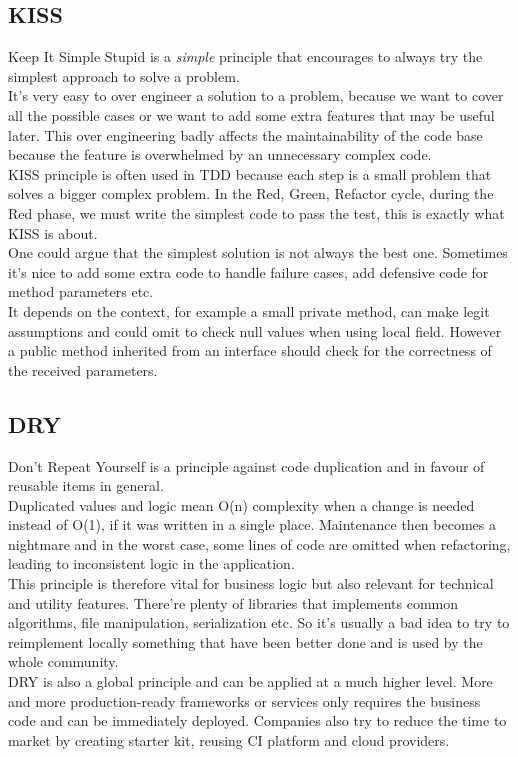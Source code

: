 \subsection{KISS}\label{subsec:kiss}
Keep It Simple Stupid is a \textit{simple} principle that encourages to
always try the simplest approach to solve a problem. \\
\newline
It's very easy to over engineer a solution to a problem, because we want
to cover all the possible cases or we want to add some extra
features that may be useful later.
This over engineering badly affects the maintainability of the code base
because the feature is overwhelmed by an unnecessary complex code. \\
\newline
KISS principle is often used in TDD because each step is a small
problem that solves a bigger complex problem.
In the Red, Green, Refactor cycle, during the Red phase, we must write
the simplest code to pass the test, this is exactly what KISS is about.
\\
\newline
One could argue that the simplest solution is not always the best one.
Sometimes it's nice to add some extra code to handle failure cases, add
defensive code for method parameters etc. \\
It depends on the context, for example a small private method, can make
legit assumptions and could omit to check null values when using
local field.
However a public method inherited from an interface should check for the
correctness of the received parameters.

\subsection{DRY}\label{subsec:dry}
Don't Repeat Yourself is a principle against code duplication and in
favour of reusable items in general. \\
\newline
Duplicated values and logic mean O(n) complexity when a change is needed
instead of O(1), if it was written in a single place.
Maintenance then becomes a nightmare and in the worst case, some lines of
code are omitted when refactoring, leading to inconsistent logic in the
application. \\
\newline
This principle is therefore vital for business logic but also relevant
for technical and utility features.
There're plenty of libraries that implements common algorithms, file
manipulation, serialization etc.
So it's usually a bad idea to try to reimplement locally something that
have been better done and is used by the whole community. \\
\newline
DRY is also a global principle and can be applied at a much higher level.
More and more production-ready frameworks or services only requires
the business code and can be immediately deployed.
Companies also try to reduce the time to market by creating starter kit,
reusing CI platform and cloud providers.

